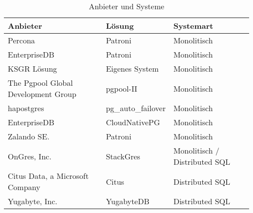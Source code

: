 \begin{table}[H]


\begin{tabular}{lll}
\toprule
Anbieter & Lösung & Systemart \\
\midrule
Percona & Patroni & Monolitisch \\
EnterpriseDB & Patroni & Monolitisch \\
KSGR Lösung & Eigenes System & Monolitisch \\
The Pgpool Global Development Group & pgpool-II & Monolitisch \\
hapostgres & pg\_auto\_failover & Monolitisch \\
EnterpriseDB & CloudNativePG & Monolitisch \\
Zalando SE. & Patroni & Monolitisch \\
OnGres, Inc. & StackGres & Monolitisch / Distributed SQL \\
Citus Data, a Microsoft Company & Citus & Distributed SQL \\
Yugabyte, Inc. & YugabyteDB & Distributed SQL \\
\bottomrule
\end{tabular}
\caption{Anbieter und Systeme} \label{solution_list}
\end{table}
